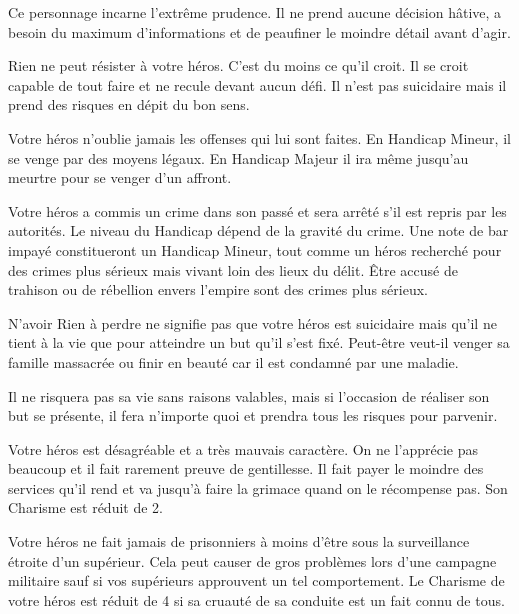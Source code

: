 \begin{description}[align=left]
    \item [Prudent (Mineur)]
        Ce personnage incarne l’extrême prudence. Il ne prend aucune décision hâtive, a besoin du maximum d’informations et de peaufiner le moindre détail avant d’agir.

    \item [Présomptueux (Majeur)]
        Rien ne peut résister à votre héros. C’est du moins ce qu’il croit. Il se croit capable de tout faire et ne recule devant aucun défi. Il n’est pas suicidaire mais il prend des risques en dépit du bon sens.

    \item [Rancunier (Mineur ou Majeur)]
        Votre héros n’oublie jamais les offenses qui lui sont faites. En Handicap Mineur, il se venge par des moyens légaux. En Handicap Majeur il ira même jusqu’au meurtre pour se venger d’un affront.

    \item [Recherché (Mineur ou Majeur)]
        Votre héros a commis un crime dans son passé et sera arrêté s’il est repris par les autorités. Le niveau du Handicap dépend de la gravité du crime. Une note de bar impayé constitueront un Handicap Mineur, tout comme un héros recherché pour des crimes plus sérieux mais vivant loin des lieux du délit. \^Etre accusé de trahison ou de rébellion envers l’empire sont des crimes plus sérieux.

    \item [Rien à perdre (Mineur)]
        N’avoir Rien à perdre ne signifie pas que votre héros est suicidaire mais qu’il ne tient à la vie que pour atteindre un but qu’il s’est fixé. Peut-être veut-il venger sa famille massacrée ou finir en beauté car il est condamné par une maladie.

        Il ne risquera pas sa vie sans raisons valables, mais si l’occasion de réaliser son but se présente, il fera n’importe quoi et prendra tous les risques pour parvenir.

    \item [Sale caractère (Mineur)]
        Votre héros est désagréable et a très mauvais caractère. On ne l’apprécie pas beaucoup et il fait rarement preuve de gentillesse. Il fait payer le moindre des services qu’il rend et va jusqu’à faire la grimace quand on le récompense pas. Son Charisme est réduit de 2.

    \item [Sanguinaire (Majeur)]
        Votre héros ne fait jamais de prisonniers à moins d’être sous la surveillance étroite d’un supérieur. Cela peut causer de gros problèmes lors d’une campagne militaire sauf si vos supérieurs approuvent un tel comportement. Le Charisme de votre héros est réduit de 4 si sa cruauté de sa conduite est un fait connu de tous.


\end{description}
